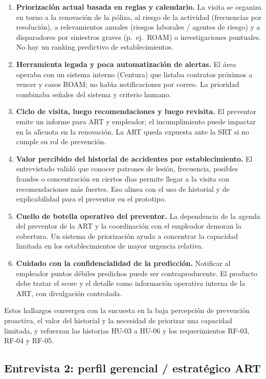 \begin{enumerate}
	\item \textbf{Priorizaci\'on actual basada en reglas y calendario.}
	La visita se organiza en torno a la renovaci\'on de la p\'oliza, al riesgo de la actividad (frecuencias por resoluci\'on), a relevamientos anuales (riesgos laborales / agentes de riesgo) y a disparadores por siniestros graves (p.\ ej.\ ROAM) o investigaciones puntuales. No hay un ranking predictivo de establecimientos.
	\item \textbf{Herramienta legada y poca automatizaci\'on de alertas.}
	El \'area operaba con un sistema interno (Centura) que listaba contratos pr\'oximos a vencer y casos ROAM; no hab\'{\i}a notificaciones por correo. La prioridad combinaba se\~nales del sistema y criterio humano.
	\item \textbf{Ciclo de visita, luego recomendaciones y luego revisita.}
	El preventor emite un informe para ART y empleador; el incumplimiento puede impactar en la al\'{\i}cuota en la renovaci\'on. La ART queda expuesta ante la SRT si no cumple su rol de prevenci\'on.
	\item \textbf{Valor percibido del historial de accidentes por establecimiento.}
	El entrevistado valid\'o que conocer patrones de lesi\'on, frecuencia, posibles fraudes o concentraci\'on en ciertos d\'{\i}as permite llegar a la visita con recomendaciones m\'as fuertes. Eso alinea con el uso de historial y de explicabilidad para el preventor en el prototipo.
	\item \textbf{Cuello de botella operativo del preventor.}
	La dependencia de la agenda del preventor de la ART y la coordinaci\'on con el empleador demoran la cobertura. Un sistema de priorizaci\'on ayuda a concentrar la capacidad limitada en los establecimientos de mayor urgencia relativa.
	\item \textbf{Cuidado con la confidencialidad de la predicci\'on.}
	Notificar al empleador puntos d\'ebiles predichos puede ser contraproducente. El producto debe tratar el score y el detalle como informaci\'on operativa interna de la ART, con divulgaci\'on controlada.
\end{enumerate}

Estos hallazgos convergen con la encuesta en la baja percepci\'on de prevenci\'on proactiva, el valor del historial y la necesidad de priorizar una capacidad limitada, y refuerzan las historias HU-03 a HU-06 y los requerimientos RF-03, RF-04 y RF-05.

\subsection{Entrevista 2: perfil gerencial / estrat\'egico ART}

